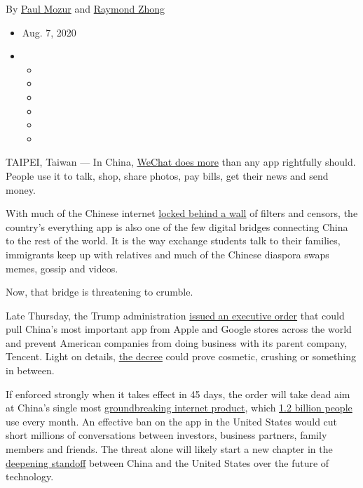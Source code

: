 By \href{https://www.nytimes.com/by/paul-mozur}{Paul Mozur} and
\href{https://www.nytimes.com/by/raymond-zhong}{Raymond Zhong}

\begin{itemize}
\item
  Aug. 7, 2020
\item
  \begin{itemize}
  \item
  \item
  \item
  \item
  \item
  \item
  \end{itemize}
\end{itemize}

TAIPEI, Taiwan --- In China,
\href{https://www.nytimes.com/video/technology/100000004574648/china-internet-wechat.html}{WeChat
does more} than any app rightfully should. People use it to talk, shop,
share photos, pay bills, get their news and send money.

With much of the Chinese internet
\href{https://www.nytimes.com/2014/09/22/business/international/china-clamps-down-on-web-pinching-companies-like-google.html}{locked
behind a wall} of filters and censors, the country's everything app is
also one of the few digital bridges connecting China to the rest of the
world. It is the way exchange students talk to their families,
immigrants keep up with relatives and much of the Chinese diaspora swaps
memes, gossip and videos.

Now, that bridge is threatening to crumble.

Late Thursday, the Trump administration
\href{https://www.nytimes.com/2020/08/06/technology/trump-wechat-tiktok-china.html?smid=tw-share}{issued
an executive order} that could pull China's most important app from
Apple and Google stores across the world and prevent American companies
from doing business with its parent company, Tencent. Light on details,
\href{https://www.whitehouse.gov/presidential-actions/executive-order-addressing-threat-posed-wechat/}{the
decree} could prove cosmetic, crushing or something in between.

If enforced strongly when it takes effect in 45 days, the order will
take dead aim at China's single most
\href{https://www.nytimes.com/2017/07/16/business/china-cash-smartphone-payments.html}{groundbreaking
internet product}, which
\href{https://mp.weixin.qq.com/s/IH09J0CGOJqaYHFWXC4fNw}{1.2 billion
people} use every month. An effective ban on the app in the United
States would cut short millions of conversations between investors,
business partners, family members and friends. The threat alone will
likely start a new chapter in the
\href{https://www.nytimes.com/2020/07/14/world/asia/cold-war-china-us.html}{deepening
standoff} between China and the United States over the future of
technology.

